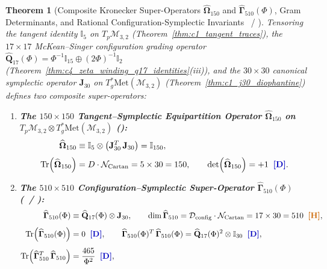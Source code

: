 \documentclass[11pt,a4paper]{article}
\newcommand{\catD}{\text{\textbf{\textcolor{blue!75!black}{[D]}}}}
\newcommand{\catH}{\text{\textbf{\textcolor{orange!80!black}{[H]}}}}
\theoremstyle{definition}
\theoremstyle{plain}
\newtheorem{theorem}[axiom]{Theorem}
\theoremstyle{remark}
\begin{document}
\begin{theorem}[Composite Kronecker Super-Operators $\widehat{\mathbf{\Omega}}_{150}$ and $\widehat{\mathbf{\Gamma}}_{510}(\Phi)$, Gram Determinants, and Rational Configuration-Symplectic Invariants \catD\ / \catH]\label{thm:c6_composite_superoperators}
Tensoring the tangent identity $\mathbb{I}_5$ on $T_p\mathcal{M}_{3,2}$ (Theorem~\ref{thm:c1_tangent_traces}), the $17\times 17$ McKean--Singer configuration grading operator $\widehat{\mathbf{Q}}_{17}(\Phi) = \Phi^{-1}\mathbb{I}_{15} \oplus (2\Phi)^{-1}\mathbb{I}_2$ (Theorem~\ref{thm:c4_zeta_winding_q17_identities}(iii)), and the $30\times 30$ canonical symplectic operator $\mathbf{J}_{30}$ on $T^*_g\mathrm{Met}(\mathcal{M}_{3,2})$ (Theorem~\ref{thm:c1_j30_diophantine}) defines two composite super-operators:
\begin{enumerate}[label=(\roman*)]
  \item \textbf{The $150\times 150$ Tangent--Symplectic Equipartition Operator $\widehat{\mathbf{\Omega}}_{150}$ on $T_p\mathcal{M}_{3,2} \otimes T^*_g\mathrm{Met}(\mathcal{M}_{3,2})$ (\catD):}
  \begin{align}
  \widehat{\mathbf{\Omega}}_{150} &\equiv \mathbb{I}_5 \otimes \left(\mathbf{J}_{30}^T\,\mathbf{J}_{30}\right) = \mathbb{I}_{150}, \nonumber \\[3pt]
  \mathrm{Tr}\!\left(\widehat{\mathbf{\Omega}}_{150}\right) &= D \cdot \mathcal{N}_{\mathrm{Cartan}} = 5 \times 30 = 150, \qquad
  \det\!\left(\widehat{\mathbf{\Omega}}_{150}\right) = +1 \;\;\catD. \label{eq:c6_omega150_invariants}
  \end{align}
  \item \textbf{The $510\times 510$ Configuration--Symplectic Super-Operator $\widehat{\mathbf{\Gamma}}_{510}(\Phi)$ (\catD\ / \catH):}
  \begin{align}
  \widehat{\mathbf{\Gamma}}_{510}(\Phi) &\equiv \widehat{\mathbf{Q}}_{17}(\Phi) \otimes \mathbf{J}_{30}, \qquad
  \dim\widehat{\mathbf{\Gamma}}_{510} = \mathcal{D}_{\mathrm{config}}\cdot\mathcal{N}_{\mathrm{Cartan}} = 17 \times 30 = 510 \;\;\catH, \nonumber \\[4pt]
  \mathrm{Tr}\!\left(\widehat{\mathbf{\Gamma}}_{510}(\Phi)\right) &= 0 \;\;\catD, \qquad
  \widehat{\mathbf{\Gamma}}_{510}(\Phi)^T\,\widehat{\mathbf{\Gamma}}_{510}(\Phi) = \widehat{\mathbf{Q}}_{17}(\Phi)^2 \otimes \mathbb{I}_{30} \;\;\catD, \nonumber \\[4pt]
  \mathrm{Tr}\!\left(\widehat{\mathbf{\Gamma}}_{510}^T\,\widehat{\mathbf{\Gamma}}_{510}\right) &= \frac{465}{\Phi^2} \;\;\catD, \qquad

\end{align}
\end{enumerate}
\end{theorem}
\end{document}
